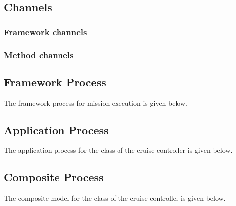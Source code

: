 \documentclass{article}
\newcommand{\reducevspaceaftersection}{\vspace{-1em}}
\begin{document}
\subsection{Channels}



\subsubsection*{Framework channels}
\reducevspaceaftersection



\subsubsection*{Method channels}
\reducevspaceaftersection



\newpage

\subsection{Framework Process}

The framework process for mission execution is given below.
%
\begin{circusbox}

\end{circusbox}

\newpage

\subsection{Application Process}

The application process for the  class of the cruise controller is given below.
%
\begin{circusflow}

\end{circusflow}



\subsection{Composite Process}

The composite model for the  class of the cruise controller is given below.
%
\begin{circusbox}

\end{circusbox}
\end{document}
